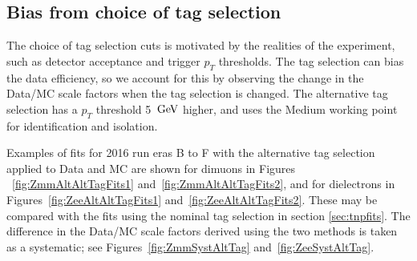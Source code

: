\subsection{Bias from choice of tag selection}
The choice of tag selection cuts is motivated by the realities of the experiment, such as
detector acceptance and trigger $p_{T}$ thresholds. The tag selection can bias the data efficiency,
so we account for this by observing the change in the Data/MC scale factors when the 
tag selection is changed. The alternative tag selection has a $p_{T}$ threshold 5 $\,\text{Ge\hspace{-.08em}V}$ higher, and 
uses the Medium working point for identification and isolation.

Examples of fits for 2016 run eras B to F with the alternative tag selection applied to Data and MC are shown for dimuons in
Figures ~\ref{fig:ZmmAltAltTagFits1} and~\ref{fig:ZmmAltAltTagFits2}, 
and for dielectrons in Figures~\ref{fig:ZeeAltAltTagFits1} and~\ref{fig:ZeeAltAltTagFits2}.
These may be compared with the fits using the nominal tag selection in section \ref{sec:tnpfits}.
The difference in the Data/MC scale factors derived using the two methods is taken as a systematic; 
see Figures~\ref{fig:ZmmSystAltTag} and~\ref{fig:ZeeSystAltTag}.


